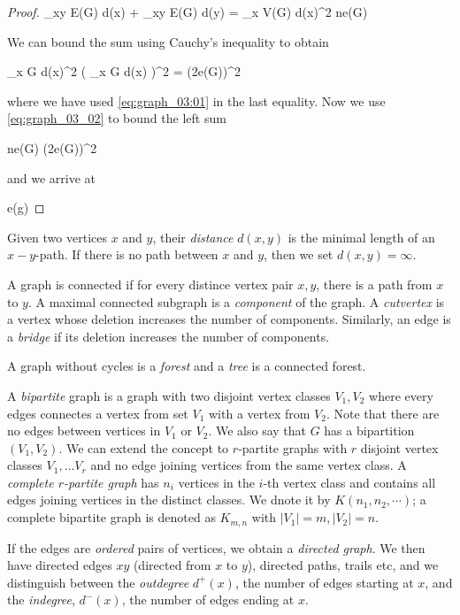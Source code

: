 \begin{proof}
  \be\label{eq:graph_03_02}
  \sum_{xy \in E(G)} d(x) + \sum_{xy \in E(G)} d(y) = \sum_{x \in V(G)} d(x)^2 \leq ne(G)
  \ee

  We can bound the sum using Cauchy's inequality to obtain

  \bee
  \sum_{x \in G} d(x)^2 \geq {} \left( \sum_{x \in G} d(x) \right)^2 =  (2e(G))^2
  \eee

  where we have used \eqref{eq:graph_03:01} in the last equality. Now we use \eqref{eq:graph_03_02} to bound the left sum

  \bee
  ne(G) \geq {} (2e(G))^2
  \eee

  and we arrive at

  \bee
  e(g) \leq {}
  \eee

\end{proof}

Given two vertices $x$ and $y$, their \emph{distance} $d(x,y)$ is the minimal length of an $x-y$-path. If there is no path between $x$ and $y$, then we set $d(x,y) = \infty$.

A graph is connected if for every distince vertex pair $x,y$, there is a path from $x$ to $y$. A maximal connected subgraph is a \emph{component} of the graph. A \emph{cutvertex} is a vertex whose deletion increases the number of components. Similarly, an edge is a \emph{bridge} if its deletion increases the number of components.

A graph without cycles is a \emph{forest} and a \emph{tree} is a connected forest.

A \emph{bipartite} graph is a graph with two disjoint vertex classes $V_1, V_2$ where every edges connectes a vertex from set $V_1$ with a vertex from $V_2$. Note that there are no edges between vertices in $V_1$ or $V_2$. We also say that $G$ has a bipartition $(V_1, V_2)$. We can extend the concept to $r$-partite graphs with $r$ disjoint vertex classes $V_1, \ldots V_r$ and no edge joining vertices from the same vertex class. A \emph{complete $r$-partite graph} has $n_i$ vertices in the $i$-th vertex class and contains all edges joining vertices in the distinct classes. We dnote it by $K(n_1, n_2, \cdots)$; a complete bipartite graph is denoted as $K_{m,n}$ with $|V_1|=m, |V_2|=n$.

If the edges are \emph{ordered} pairs of vertices, we obtain a \emph{directed graph}. We then have directed edges $xy$ (directed from $x$ to $y$), directed paths, trails etc, and we distinguish between the \emph{outdegree} $d^+(x)$, the number of edges starting at $x$, and the \emph{indegree}, $d^-(x)$, the number of edges ending at $x$.

  
